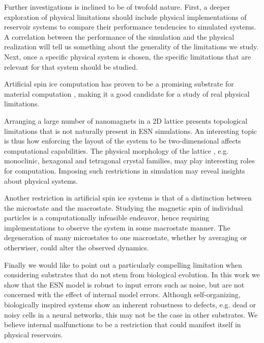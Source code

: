 Further investigations is inclined to be of twofold nature. First, a deeper
exploration of physical limitations should include physical implementations of
reservoir systems to compare their performance tendencies to simulated
systems. A correlation between the performance of the simulation and the
physical realization will tell us something about the generality of the
limitations we study. Next, once a specific physical system is chosen, the
specific limitations that are relevant for that system should be studied.

Artificial spin ice computation has proven to be a promising substrate for
material computation \cite{jensen_computation_2018}, making it a good candidate
for a study of real physical limitations.

Arranging a large number of nanomagnets in a 2D lattice presents topological
limitations that is not naturally present in ESN simulations. An interesting
topic is thus how enforcing the layout of the system to be two-dimensional
affects computational capabilities. The physical morphology of the lattice ,
e.g. monoclinic, hexagonal and tetragonal crystal families, may play interesting
roles for computation. Imposing such restrictions in simulation may reveal
insights about physical systems.

Another restriction in artificial spin ice systems is that of a distinction
between the microstate and the macrostate. Studying the magnetic spin of
individual particles is a computationally infeasible endeavor, hence requiring
implementations to observe the system in some macrostate manner. The
degeneration of many microstates to one macrostate, whether by averaging or
otherwiser, could alter the observed dynamics.

Finally we would like to point out a particularly compelling limitation when
considering substrates that do not stem from biological evolution. In this work
we show that the ESN model is robust to input errors such as noise, but are not
concerned with the effect of internal model errors. Although self-organizing,
biologically inspired systems show an inherent robustness to defects, e.g. dead
or noisy cells in a neural networks, this may not be the case in other
substrates. We believe internal malfunctions to be a restriction that could
manifest itself in physical reservoirs.

